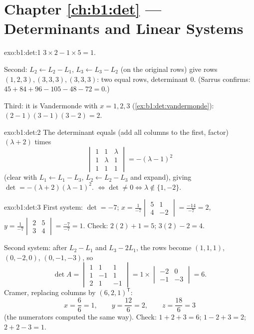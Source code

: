 \section*{Chapter \ref{ch:b1:det} --- Determinants and Linear Systems}

\begin{solution}{exo:b1:det:1}
$3 \times 2 - 1 \times 5 = 1$.

Second: $L_2 \leftarrow L_2 - L_1$, $L_3 \leftarrow L_3 - L_2$ (on
the original rows) give rows $(1,2,3), (3,3,3), (3,3,3)$: two equal
rows, determinant $0$. (Sarrus confirms: $45 + 84 + 96 - 105 - 48 -
72 = 0$.)

Third: it is Vandermonde with $x = 1, 2, 3$
(\cref{ex:b1:det:vandermonde}): $(2-1)(3-1)(3-2) = 2$.
\end{solution}

\begin{solution}{exo:b1:det:2}
The determinant equals (add all columns to the first, factor)
$(\lambda + 2)$ times
\[
\begin{vmatrix}
1 & 1 & \lambda\\ 1 & \lambda & 1\\ 1 & 1 & 1
\end{vmatrix}
= -(\lambda - 1)^2
\]
(clear with $L_1 \leftarrow L_1 - L_3$, $L_2 \leftarrow L_2 - L_3$
and expand), giving $\det = -(\lambda+2)(\lambda-1)^2$. 
$\iff \det \neq 0 \iff \lambda \notin \{1, -2\}$.
\end{solution}

\begin{solution}{exo:b1:det:3}
First system: $\det = -7$;
$x = \frac{1}{-7}\begin{vmatrix} 5 & 1\\ 4 & -2\end{vmatrix}
= \frac{-14}{-7} = 2$,
$y = \frac{1}{-7}\begin{vmatrix} 2 & 5\\ 3 & 4\end{vmatrix}
= \frac{-7}{-7} = 1$. Check: $2(2) + 1 = 5$; $3(2) - 2 = 4$.

Second system: after $L_2 - L_1$ and $L_3 - 2L_1$, the rows become
$(1,1,1)$, $(0,-2,0)$, $(0,-1,-3)$, so
\[
\det A = \begin{vmatrix} 1&1&1\\ 1&-1&1\\ 2&1&-1\end{vmatrix}
= 1 \times \begin{vmatrix} -2 & 0\\ -1 & -3\end{vmatrix} = 6 .
\]
Cramer, replacing columns by $(6,2,1)^{\mathsf T}$:
\[
x = \frac{6}{6} = 1, \qquad
y = \frac{12}{6} = 2, \qquad
z = \frac{18}{6} = 3
\]
(the numerators computed the same way). Check: $1 + 2 + 3 = 6$; $1 -
2 + 3 = 2$; $2 + 2 - 3 = 1$.
\end{solution}


